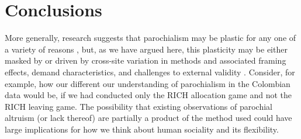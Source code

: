 \documentclass[bibauthoryear]{aa}
\begin{document}

\section{Conclusions}

More generally,  research suggests that parochialism may be plastic for any one of a variety of reasons \citep{hruschka2013economic, pisor2019evolution}, but, as we have argued here, this plasticity may be either masked by or driven by cross-site variation in methods and associated framing effects, demand characteristics, and challenges to external validity \citep{naargaming}. Consider, for example, how our different our understanding of parochialism in the Colombian data would be, if we had conducted only the RICH allocation game and not the RICH leaving game. The possibility that existing observations of parochial altruism (or lack thereof) are partially a product of the method used could have large implications for how we think about human sociality and its flexibility.
\end{document}
